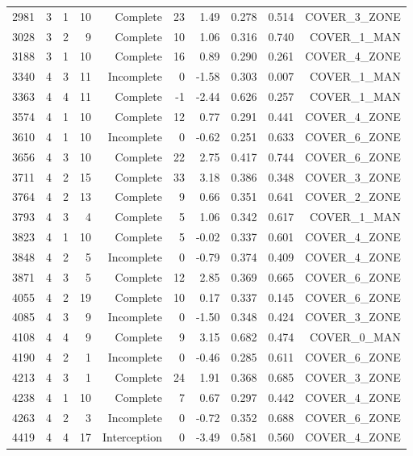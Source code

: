 \begin{tabular}{rrrrrrrrrr}
2981 & 3 & 1 & 10 & Complete & 23 & 1.49 & 0.278 & 0.514 & COVER\_3\_ZONE \\
3028 & 3 & 2 & 9 & Complete & 10 & 1.06 & 0.316 & 0.740 & COVER\_1\_MAN \\
3188 & 3 & 1 & 10 & Complete & 16 & 0.89 & 0.290 & 0.261 & COVER\_4\_ZONE \\
3340 & 4 & 3 & 11 & Incomplete & 0 & -1.58 & 0.303 & 0.007 & COVER\_1\_MAN \\
3363 & 4 & 4 & 11 & Complete & -1 & -2.44 & 0.626 & 0.257 & COVER\_1\_MAN \\
3574 & 4 & 1 & 10 & Complete & 12 & 0.77 & 0.291 & 0.441 & COVER\_4\_ZONE \\
3610 & 4 & 1 & 10 & Incomplete & 0 & -0.62 & 0.251 & 0.633 & COVER\_6\_ZONE \\
3656 & 4 & 3 & 10 & Complete & 22 & 2.75 & 0.417 & 0.744 & COVER\_6\_ZONE \\
3711 & 4 & 2 & 15 & Complete & 33 & 3.18 & 0.386 & 0.348 & COVER\_3\_ZONE \\
3764 & 4 & 2 & 13 & Complete & 9 & 0.66 & 0.351 & 0.641 & COVER\_2\_ZONE \\
3793 & 4 & 3 & 4 & Complete & 5 & 1.06 & 0.342 & 0.617 & COVER\_1\_MAN \\
3823 & 4 & 1 & 10 & Complete & 5 & -0.02 & 0.337 & 0.601 & COVER\_4\_ZONE \\
3848 & 4 & 2 & 5 & Incomplete & 0 & -0.79 & 0.374 & 0.409 & COVER\_4\_ZONE \\
3871 & 4 & 3 & 5 & Complete & 12 & 2.85 & 0.369 & 0.665 & COVER\_6\_ZONE \\
4055 & 4 & 2 & 19 & Complete & 10 & 0.17 & 0.337 & 0.145 & COVER\_6\_ZONE \\
4085 & 4 & 3 & 9 & Incomplete & 0 & -1.50 & 0.348 & 0.424 & COVER\_3\_ZONE \\
4108 & 4 & 4 & 9 & Complete & 9 & 3.15 & 0.682 & 0.474 & COVER\_0\_MAN \\
4190 & 4 & 2 & 1 & Incomplete & 0 & -0.46 & 0.285 & 0.611 & COVER\_6\_ZONE \\
4213 & 4 & 3 & 1 & Complete & 24 & 1.91 & 0.368 & 0.685 & COVER\_3\_ZONE \\
4238 & 4 & 1 & 10 & Complete & 7 & 0.67 & 0.297 & 0.442 & COVER\_4\_ZONE \\
4263 & 4 & 2 & 3 & Incomplete & 0 & -0.72 & 0.352 & 0.688 & COVER\_6\_ZONE \\
4419 & 4 & 4 & 17 & Interception & 0 & -3.49 & 0.581 & 0.560 & COVER\_4\_ZONE \\
\bottomrule
\end{tabular}
